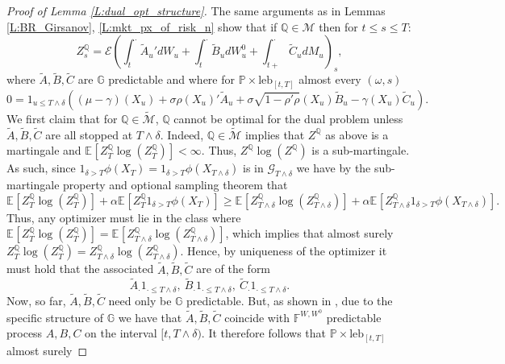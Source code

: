 \documentclass[11pt, letterpaper]{amsart}
\theoremstyle{definition}
\theoremstyle{remark}
\numberwithin{equation}{section}
\newcommand{\prob}{\mathbb{P}}
\newcommand{\qprob}{\mathbb{Q}}
\newcommand{\esp}{\mathbb{E}}
\newcommand{\espalt}[2]{\esp^{#1}\bra{#2}}
\newcommand{\G}{\mathcal{G}}
\newcommand{\M}{\mathcal{M}}
\newcommand{\tM}{\widetilde{\mathcal{M}}}
\newcommand{\filt}{\mathbb{F}}
\newcommand{\filtg}{\mathbb{G}}
\newcommand{\EN}{\mathcal{E}}
\newcommand{\bra}[1]{\left[#1\right]}
\begin{document}
\begin{proof}[Proof of Lemma \ref{L:dual_opt_structure}]
The same arguments as in Lemmas \ref{L:BR_Girsanov}, \ref{L:mkt_px_of_risk_n} show that if $\qprob\in\M$ then for $t\leq s\leq T$:
\begin{equation*}
Z^{\qprob}_s = \EN\left(\int_t^{\cdot} \tilde{A}_u'dW_u + \int_t^\cdot \tilde{B}_u dW^0_u + \int_{t+}^\cdot \tilde{C}_u dM_u\right)_s,
\end{equation*}
where $\tilde{A},\tilde{B},\tilde{C}$ are $\filtg$ predictable and where for $\prob\times\textrm{leb}_{[t,T]}$ almost every $(\omega,s)$
\begin{equation*}
0 = 1_{u\leq T\wedge\delta}\left((\mu-\gamma)(X_u) + \sigma\rho(X_u)'\tilde{A}_u + \sigma\sqrt{1-\rho'\rho}(X_u)\tilde{B}_u - \gamma(X_u)\tilde{C}_u\right).
\end{equation*}
We first claim that for $\qprob\in\tM$, $\qprob$ cannot be optimal for the dual problem unless $\tilde{A},\tilde{B},\tilde{C}$ are all stopped at $T\wedge\delta$.  Indeed, $\qprob\in\tM$ implies that $Z^\qprob$ as above is a martingale and $\espalt{}{Z^\qprob_T\log\left(Z^\qprob_T\right)} < \infty$. Thus, $Z^\qprob \log(Z^\qprob)$ is a sub-martingale. As such, since $1_{\delta>T}\phi(X_T) = 1_{\delta>T}\phi(X_{T\wedge\delta})$ is in $\G_{T\wedge\delta}$ we have by the sub-martingale property and optional sampling theorem that
\begin{equation*}
\espalt{}{Z^{\qprob}_T\log\left(Z^{\qprob}_T\right)} + \alpha\espalt{}{Z^{\qprob}_T 1_{\delta>T}\phi(X_T)} \geq \espalt{}{Z^{\qprob}_{T\wedge\delta}\log\left(Z^{\qprob}_{T\wedge\delta}\right)} + \alpha\espalt{}{Z^{\qprob}_{T\wedge\delta} 1_{\delta>T}\phi(X_{T\wedge\delta})}.
\end{equation*}
Thus, any optimizer must lie in the class where $\espalt{}{Z^{\qprob}_T\log\left(Z^{\qprob}_T\right)} = \espalt{}{Z^{\qprob}_{T\wedge\delta}\log\left(Z^{\qprob}_{T\wedge\delta}\right)}$,  which implies that almost surely $Z^{\qprob}_T\log\left(Z^{\qprob}_T\right) = Z^{\qprob}_{T\wedge\delta}\log\left(Z^{\qprob}_{T\wedge\delta}\right)$.
Hence, by uniqueness of the optimizer it must hold that the associated $\tilde{A},\tilde{B},\tilde{C}$ are of the form
\begin{equation}
\tilde{A}_\cdot 1_{\cdot\leq T\wedge\delta}, \ \tilde{B}_\cdot 1_{\cdot\leq T\wedge\delta}, \ \tilde{C}_\cdot 1_{\cdot\leq T\wedge\delta}.
\end{equation}
Now, so far, $\tilde{A},\tilde{B},\tilde{C}$ need only be $\filtg$ predictable.  But, as shown in \cite[Chapter 5]{bielecki2004credit}, due to the specific structure of $\filtg$ we have that $\tilde{A},\tilde{B},\tilde{C}$ coincide with $\filt^{W,W^0}$ predictable process $A,B,C$ on the interval $[t,T\wedge \delta)$. It therefore follows that $\prob\times\textrm{leb}_{[t,T]}$ almost surely

\end{proof}
\end{document}
